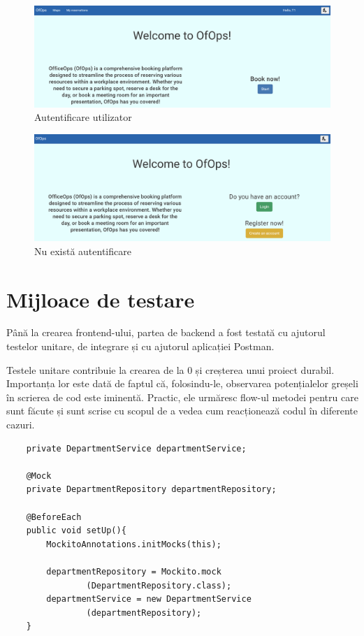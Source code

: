 \newpage
\begin{figure}[!htb]
    \centering
    \includegraphics[width=0.9\linewidth]{images/pagina-utilizator.png}
    \caption{Autentificare utilizator}
    \label{fig:pagina-utilizator}
\end{figure}

\begin{figure}[!htb]
    \centering
    \includegraphics[width=0.9\linewidth]{images/pagina-nelogat.png}
    \caption{Nu există autentificare}
    \label{fig:pagina-nelogat}
\end{figure}

\section{Mijloace de testare}
Până la crearea frontend-ului, partea de backend a fost testată cu ajutorul testelor unitare, de integrare și cu ajutorul aplicației Postman.

Testele unitare contribuie la crearea de la 0 și creșterea unui proiect durabil.\cite{citation7} Importanța lor este dată de faptul că, folosindu-le, observarea potențialelor greșeli în scrierea de cod este iminentă. Practic, ele urmăresc flow-ul metodei pentru care sunt făcute și sunt scrise cu scopul de a vedea cum reacționează codul în diferente cazuri.

\begin{center}
\begin{minipage}{0.9\textwidth}
\captionsetup{type=listing}
   \begin{lstlisting}
    private DepartmentService departmentService;

    @Mock
    private DepartmentRepository departmentRepository;

    @BeforeEach
    public void setUp(){
        MockitoAnnotations.initMocks(this);

        departmentRepository = Mockito.mock
                (DepartmentRepository.class);
        departmentService = new DepartmentService
                (departmentRepository);
    }
    \end{lstlisting} 
\end{minipage}
\end{center}


